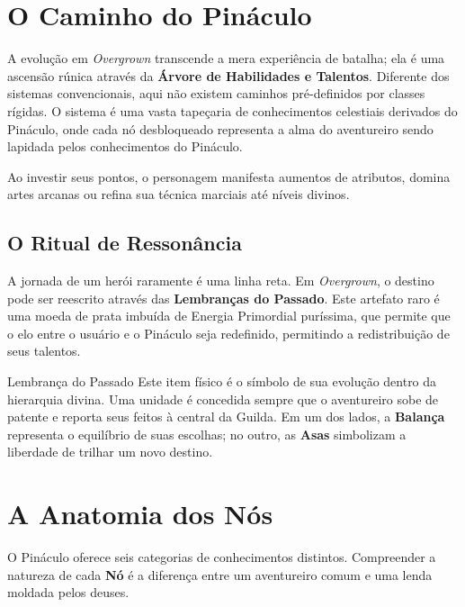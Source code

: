 
\section*{O Caminho do Pináculo}

A evolução em \textit{Overgrown} transcende a mera experiência de batalha; ela é uma ascensão rúnica através da \textbf{Árvore de Habilidades e Talentos}. Diferente dos sistemas convencionais, aqui não existem caminhos pré-definidos por classes rígidas. O sistema é uma vasta tapeçaria de conhecimentos celestiais derivados do Pináculo, onde cada nó desbloqueado representa a alma do aventureiro sendo lapidada pelos conhecimentos do Pináculo.

Ao investir seus pontos, o personagem manifesta aumentos de atributos, domina artes arcanas ou refina sua técnica marciais até níveis divinos.

\subsection*{O Ritual de Ressonância}
A jornada de um herói raramente é uma linha reta. Em \textit{Overgrown}, o destino pode ser reescrito através das \textbf{Lembranças do Passado}. Este artefato raro é uma moeda de prata imbuída de Energia Primordial puríssima, que permite que o elo entre o usuário e o Pináculo seja redefinido, permitindo a redistribuição de seus talentos.

\begin{rpgboxtips}{Lembrança do Passado}
Este item físico é o símbolo de sua evolução dentro da hierarquia divina. Uma unidade é concedida sempre que o aventureiro sobe de patente e reporta seus feitos à central da Guilda. Em um dos lados, a \textbf{Balança} representa o equilíbrio de suas escolhas; no outro, as \textbf{Asas} simbolizam a liberdade de trilhar um novo destino.
\end{rpgboxtips}

\section*{A Anatomia dos Nós}
O Pináculo oferece seis categorias de conhecimentos distintos. Compreender a natureza de cada \textbf{Nó} é a diferença entre um aventureiro comum e uma lenda moldada pelos deuses.

